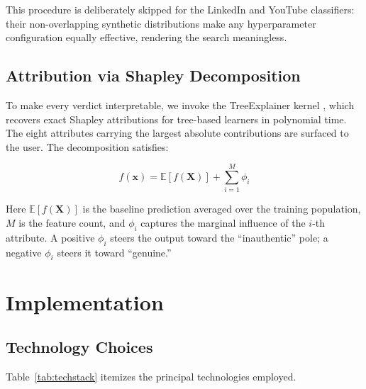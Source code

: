 \documentclass[conference]{IEEEtran}
\begin{document}
This procedure is deliberately skipped for the LinkedIn and YouTube classifiers: their non-overlapping synthetic distributions make any hyperparameter configuration equally effective, rendering the search meaningless.

\subsection{Attribution via Shapley Decomposition}

To make every verdict interpretable, we invoke the TreeExplainer kernel \cite{lundberg2017shap}, which recovers exact Shapley attributions for tree-based learners in polynomial time. The eight attributes carrying the largest absolute contributions are surfaced to the user. The decomposition satisfies:

\begin{equation}
f(\mathbf{x}) = \mathbb{E}[f(\mathbf{X})] + \sum_{i=1}^{M} \phi_i
\end{equation}

\noindent Here $\mathbb{E}[f(\mathbf{X})]$ is the baseline prediction averaged over the training population, $M$ is the feature count, and $\phi_i$ captures the marginal influence of the $i$-th attribute. A positive $\phi_i$ steers the output toward the ``inauthentic'' pole; a negative $\phi_i$ steers it toward ``genuine.''

\section{Implementation}

\subsection{Technology Choices}

Table~\ref{tab:techstack} itemizes the principal technologies employed.
\end{document}
